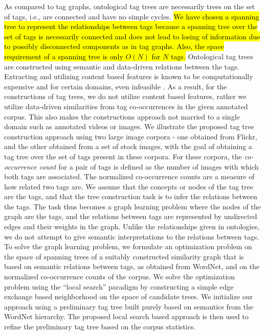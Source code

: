{%
As compared to tag graphs, ontological tag trees are necessarily trees on the set of tags, i.e., are connected and have no simple cycles. \hl{We have chosen a spanning tree to represent the relationships between tags because a spanning tree over the set of tags is necessarily connected and does not lead to losing of information due to possibly disconnected components as in tag graphs. Also, the space requirement of a spanning tree is only $O(N)$ for $N$ tags.} Ontological tag trees are constructed using semantic and data-driven relations between the tags. 
Extracting and utilizing content based features is known to be computationally expensive and for certain domains, even infeasible {\cite{huang2010text}\cite{song2010taxonomic}\cite{zanetti2008walk}\cite{yin2009exploring}}. As a result, for the constructions of tag trees, we do not utilize content based features, rather we utilize data-driven similarities from tag co-occurrences in the given annotated corpus. This also makes the constructions approach not married to a single domain such as annotated videos or images.
We illustrate the proposed tag tree construction approach using two large image corpora - one obtained from Flickr, and the other obtained from a set of stock images, with the goal of obtaining a tag tree over the set of tags present in these corpora.
For these corpora, the \emph{co-occurrence count} for a pair of tags is defined as the number of images with which both tags are associated. The normalized co-occurrence counts are a measure of how related two tags are. We assume that the concepts or nodes of the tag tree are the tags, and that the tree construction task is to infer the relations between the tags. The task thus becomes a graph learning problem where the nodes of the graph are the tags, and the relations between tags are represented by undirected edges and their weights in the graph. Unlike the relationships given in ontologies, we do not attempt to give semantic interpretations to the relations between tags. 
To solve the graph learning problem, we formulate an optimization problem on the space of spanning trees of a suitably constructed similarity graph that is based on semantic relations between tags, as obtained from WordNet, and on the normalized co-occurrence counts of the corpus. We solve the optimization problem using the ``local search'' paradigm by constructing a simple edge exchange based neighborhood on the space of candidate trees. We initialize our approach using a preliminary tag tree built purely based on semantics from the WordNet hierarchy. The proposed local search based approach is then used to refine the preliminary tag tree based on the corpus statistics.
}
